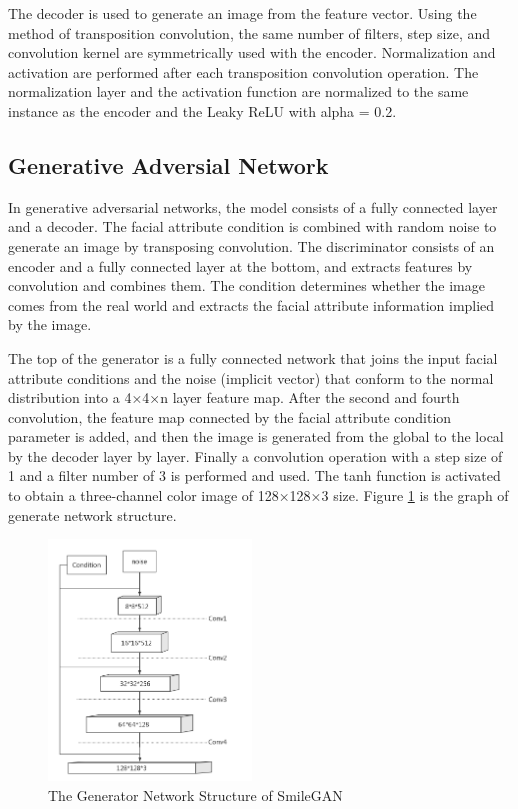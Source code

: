 The decoder is used to generate an image from the feature vector.
Using the method of transposition convolution, the same number of filters,
    step size, and convolution kernel are symmetrically used with the encoder.
Normalization and activation are performed after each transposition convolution operation.
The normalization layer and the activation function are normalized to the same instance as the encoder and the Leaky ReLU with alpha = 0.2.


\subsection{Generative Adversial Network}

In generative adversarial networks, the model consists of a fully connected layer and a decoder.
The facial attribute condition is combined with random noise to generate an image by transposing convolution.
The discriminator consists of an encoder and a fully connected layer at the bottom,
    and extracts features by convolution and combines them.
The condition determines whether the image comes from the real world and extracts the facial attribute information implied by the image.

The top of the generator is a fully connected network that joins the input facial attribute conditions and the noise (implicit vector) that conform to the normal distribution into a 4×4×n layer feature map.
After the second and fourth convolution, the feature map connected by the facial attribute condition parameter is added,
    and then the image is generated from the global to the local by the decoder layer by layer.
Finally a convolution operation with a step size of 1 and a filter number of 3 is performed and used.
The tanh function is activated to obtain a three-channel color image of 128×128×3 size.
Figure \ref{net_generator} is the graph of generate network structure.

\begin{figure}
    \begin{center}
    \includegraphics[width=0.48\textwidth]{figures/net_generator.png}
    \caption{The Generator Network Structure of SmileGAN}
    \label{net_generator}
    \end{center}
\end{figure}

